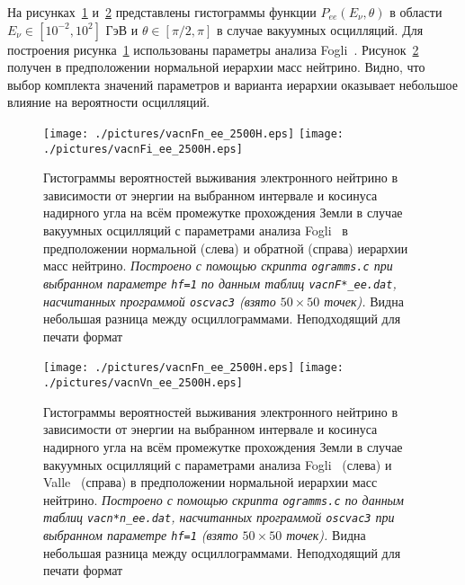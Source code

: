 На рисунках~\ref{vacn3DF} и~\ref{vacn3Dn} представлены гистограммы функции $P_{ee}(E_{\nu},\theta)$ в области $E_{\nu}\in[10^{-2},10^{2}]$ ГэВ и $\theta\in[\pi/2,\pi]$ в случае вакуумных осцилляций. Для построения рисунка~\ref{vacn3DF} использованы параметры анализа Fogli~\cite{Fogli:2012ua}. Рисунок~\ref{vacn3Dn} получен в предположении нормальной иерархии масс нейтрино. Видно, что выбор комплекта значений параметров и варианта иерархии оказывает небольшое влияние на вероятности осцилляций.
\clearpage
\begin{figure}[!ht]
\texttt{[image: ./pictures/vacnFn\_ee\_2500H.eps]}
\texttt{[image: ./pictures/vacnFi\_ee\_2500H.eps]}
\caption{Гистограммы вероятностей выживания электронного нейтрино в зависимости от энергии на выбранном интервале и косинуса надирного угла на всём промежутке прохождения Земли в случае вакуумных осцилляций с параметрами анализа Fogli~\cite{Fogli:2012ua} в предположении нормальной (слева) и обратной (справа) иерархии масс нейтрино. \textit{Построено с помощью скрипта \texttt{ogramms.c} при выбранном параметре \texttt{hf=1} по данным таблиц \texttt{vacnF*\_ee.dat}, насчитанных программой \texttt{oscvac3} (взято $50\times50$ точек).} Видна небольшая разница между осциллограммами. {\color{magenta}Неподходящий для печати формат}}
\label{vacn3DF}
\end{figure}

\begin{figure}[!ht]
\texttt{[image: ./pictures/vacnFn\_ee\_2500H.eps]}
\texttt{[image: ./pictures/vacnVn\_ee\_2500H.eps]}
\caption{Гистограммы вероятностей выживания электронного нейтрино в зависимости от энергии на выбранном интервале и косинуса надирного угла на всём промежутке прохождения Земли в случае вакуумных осцилляций с параметрами анализа Fogli~\cite{Fogli:2012ua} (слева) и Valle~\cite{Tortola:2012te} (справа) в предположении нормальной иерархии масс нейтрино. \textit{Построено с помощью скрипта \texttt{ogramms.c} по данным таблиц \texttt{vacn*n\_ee.dat}, насчитанных программой \texttt{oscvac3} при выбранном параметре \texttt{hf=1} (взято $50\times50$ точек).} Видна небольшая разница между осциллограммами. {\color{magenta}Неподходящий для печати формат}}
\label{vacn3Dn}
\end{figure}

